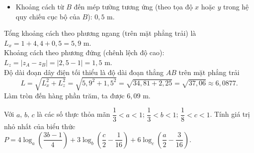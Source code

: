 \begin{ex}
{\begin{itemize}
			\item Khoảng cách từ $B$ đến mép tường tương ứng (theo tọa độ $x$ hoặc $y$ trong hệ quy chiếu cục bộ của $B$): $0{,}5$ m.
		\end{itemize}
		Tổng khoảng cách theo phương ngang (trên mặt phẳng trải) là
		$L_x = 1 + 4{,}4 + 0{,}5 = 5{,}9$ m.\\
		Khoảng cách theo phương đứng (chênh lệch độ cao):
		$L_z = |z_A - z_B| = |2{,}5 - 1| = 1{,}5$ m.\\
		Độ dài đoạn dây điện tối thiểu là độ dài đoạn thẳng $AB$ trên mặt phẳng trải
		\[L = \sqrt{L_x^2 + L_z^2} = \sqrt{5{,}9^2 + 1{,}5^2} = \sqrt{34{,}81 + 2{,}25} = \sqrt{37{,}06} \approx 6{,}0877.\]
		Làm tròn đến hàng phần trăm, ta được $6{,}09$ m.
	}
\end{ex}

\begin{ex}%
	Với $a$, $b$, $c$ là các số thực thỏa mãn $\dfrac{1}{3} < a < 1$; $\dfrac{1}{3} < b < 1$; $\dfrac{1}{8} < c < 1$. Tính giá trị nhỏ nhất của biểu thức $P=4\log_{a}\left(\dfrac{3b-1}{4}\right)+3\log_{b}\left(\dfrac{c}{2}-\dfrac{1}{16}\right)+6\log_{c}\left(\dfrac{a}{2}-\dfrac{3}{16}\right)$.
	\par{}
\end{ex}

